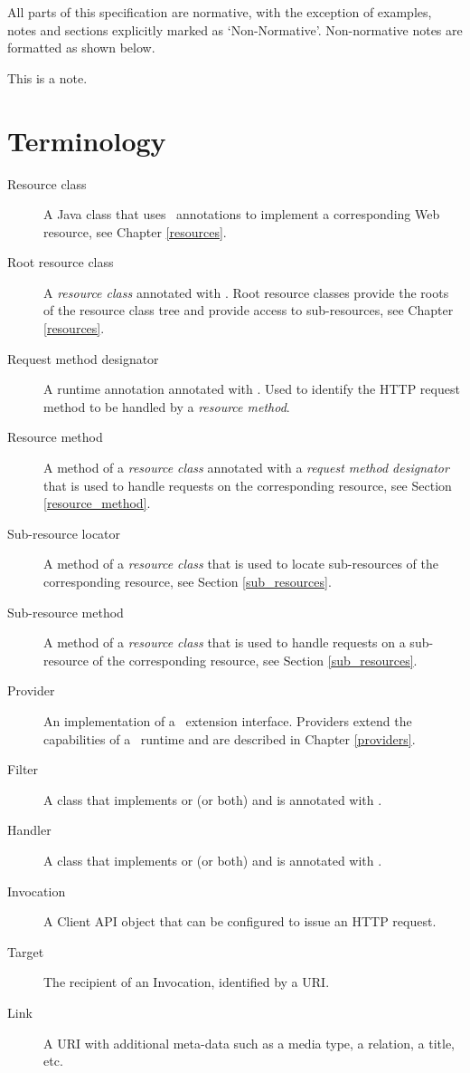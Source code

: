 All parts of this specification are normative, with the exception of examples, notes and sections explicitly marked as `Non-Normative'. Non-normative notes are formatted as shown below.

\begin{nnnote*}
This is a note.
\end{nnnote*}

\section{Terminology}
\label{terminology}

\begin{description}
\item[Resource class] A Java class that uses \jaxrs\ annotations to implement a corresponding Web resource, see Chapter \ref{resources}.
\item[Root resource class] A {\em resource class} annotated with \Path. Root resource classes provide the roots of the resource class tree and provide access to sub-resources, see Chapter \ref{resources}.
\item[Request method designator] A runtime annotation annotated with \HttpMethod. Used to identify the HTTP request method to be handled by a {\em resource method}.
\item[Resource method] A method of a {\em resource class} annotated with a {\em request method designator} that is used to handle requests on the corresponding resource, see Section \ref{resource_method}.
\item[Sub-resource locator] A method of a {\em resource class} that is used to locate sub-resources of the corresponding resource, see Section \ref{sub_resources}.
\item[Sub-resource method] A method of a {\em resource class} that is used to handle requests on a sub-resource of the corresponding resource, see Section \ref{sub_resources}.
\item[Provider] An implementation of a \jaxrs\ extension interface. Providers extend the capabilities of a \jaxrs\ runtime and are described in Chapter \ref{providers}.
\item[Filter] A class that implements  or  (or both) and is annotated with \Provider.
\item[Handler] A class that implements  or  (or both) and is annotated with \Provider.
\item[Invocation] A Client API object that can be configured to issue an HTTP request.
\item[Target] The recipient of an Invocation, identified by a URI.
\item[Link] A URI with additional meta-data such as a media type, a relation, a title, etc.

\end{description}

